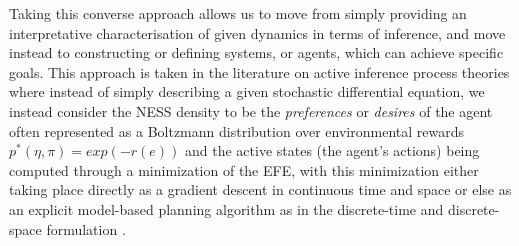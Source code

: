 Taking this converse approach allows us to move from simply providing an interpretative characterisation of given dynamics in terms of inference, and move instead to constructing or defining systems, or agents, which can achieve specific goals. This approach is taken in the literature on active inference process theories \citep{friston2012active,friston2015active,friston2017active,da2020active} where instead of simply describing a given stochastic differential equation, we instead consider the NESS density to be the \emph{preferences} or \emph{desires} of the agent often represented as a Boltzmann distribution over environmental rewards $p^*(\eta,\pi) = exp(-r(e))$ and the active states (the agent's actions) being computed through a minimization of the EFE, with this minimization either taking place directly as a gradient descent in continuous time and space \citep{friston2009reinforcement} or else as an explicit model-based planning algorithm as in the discrete-time and discrete-space formulation \citep{friston2017process,tschantz2020reinforcement,millidge_deep_2019,millidge2020relationship}.

